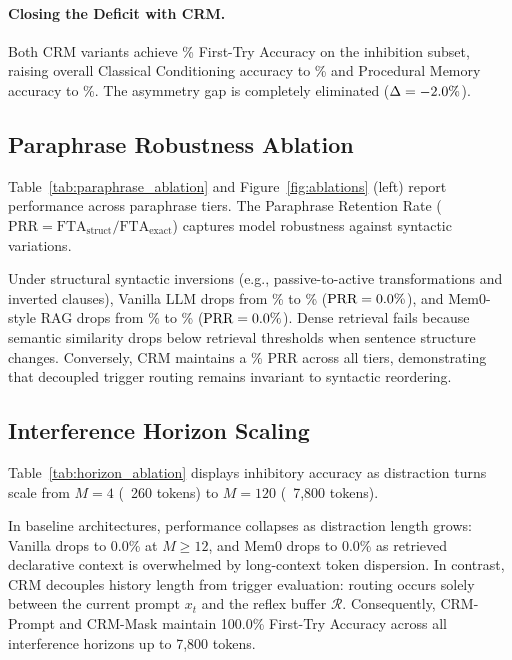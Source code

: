\documentclass[10pt,conference]{IEEEtran}
\begin{document}
\paragraph{Closing the Deficit with CRM.}
Both CRM variants achieve \ValcrmpromptInhibition\% First-Try Accuracy on the inhibition subset, raising overall Classical Conditioning accuracy to \ValcrmpromptClassical\% and Procedural Memory accuracy to \ValcrmpromptProcedural\%. The asymmetry gap is completely eliminated ($\Delta = -2.0\%$).

\subsection{Paraphrase Robustness Ablation}

Table~\ref{tab:paraphrase_ablation} and Figure~\ref{fig:ablations} (left) report performance across paraphrase tiers. The Paraphrase Retention Rate ($\text{PRR} = \text{FTA}_{\text{struct}} / \text{FTA}_{\text{exact}}$) captures model robustness against syntactic variations.

Under structural syntactic inversions (e.g., passive-to-active transformations and inverted clauses), Vanilla LLM drops from \ValParavanillaExact\% to \ValParavanillaStructural\% ($\text{PRR} = 0.0\%$), and Mem0-style RAG drops from \ValParamemZeroragExact\% to \ValParamemZeroragStructural\% ($\text{PRR} = 0.0\%$). Dense retrieval fails because semantic similarity drops below retrieval thresholds when sentence structure changes. Conversely, CRM maintains a \ValParacrmpromptPRR\% PRR across all tiers, demonstrating that decoupled trigger routing remains invariant to syntactic reordering.



\subsection{Interference Horizon Scaling}

Table~\ref{tab:horizon_ablation} displays inhibitory accuracy as distraction turns scale from $M=4$ (~260 tokens) to $M=120$ (~7,800 tokens).

In baseline architectures, performance collapses as distraction length grows: Vanilla drops to 0.0\% at $M \ge 12$, and Mem0 drops to 0.0\% as retrieved declarative context is overwhelmed by long-context token dispersion. In contrast, CRM decouples history length from trigger evaluation: routing occurs solely between the current prompt $x_t$ and the reflex buffer $\mathcal{R}$. Consequently, CRM-Prompt and CRM-Mask maintain 100.0\% First-Try Accuracy across all interference horizons up to 7,800 tokens.
\end{document}
